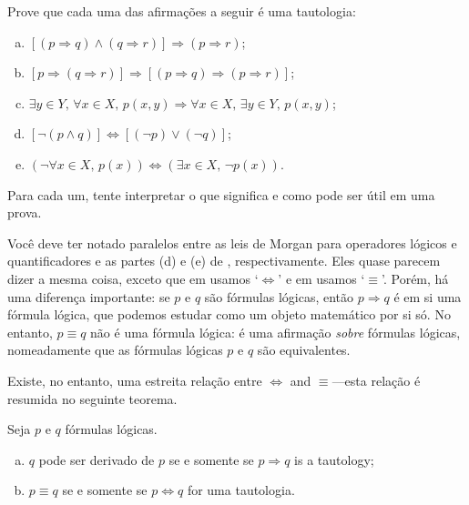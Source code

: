 \begin{exercise}
\label{exTautologies}
Prove que cada uma das afirmações a seguir é uma tautologia:
\begin{enumerate}[(a)]
\item $[(p \Rightarrow q) \wedge (q \Rightarrow r)] \Rightarrow (p \Rightarrow r)$;
\item $[p \Rightarrow (q \Rightarrow r)] \Rightarrow [(p \Rightarrow q) \Rightarrow (p \Rightarrow r)]$;
\item $\exists y \in Y,\, \forall x \in X,\, p(x,y) \Rightarrow \forall x \in X,\, \exists y \in Y,\, p(x,y)$;
\item $[\neg (p \wedge q)] \Leftrightarrow [(\neg p) \vee (\neg q)]$;
\item $(\neg \forall x \in X,\, p(x)) \Leftrightarrow (\exists x \in X,\, \neg p(x))$.
\end{enumerate}
Para cada um, tente interpretar o que significa e como pode ser útil em uma prova.
\end{exercise}

Você deve ter notado paralelos entre as leis de Morgan para operadores lógicos e quantificadores e as partes (d) e (e) de , respectivamente. Eles quase parecem dizer a mesma coisa, exceto que em  usamos `$\Leftrightarrow$' e em  usamos `$\equiv$'. Porém, há uma diferença importante: se $p$ e $q$ são fórmulas lógicas, então $p \Rightarrow q$ é em si uma fórmula lógica, que podemos estudar como um objeto matemático por si só. No entanto, $p \equiv q$ não é uma fórmula lógica: é uma afirmação \textit{sobre} fórmulas lógicas, nomeadamente que as fórmulas lógicas $p$ e $q$ são equivalentes.

Existe, no entanto, uma estreita relação entre $\Leftrightarrow$ and $\equiv$---esta relação é resumida no seguinte teorema.

\begin{theorem}
\label{thmTautologyAndDerivation}
Seja $p$ e $q$ fórmulas lógicas.
\begin{enumerate}[(a)]
\item $q$ pode ser derivado de $p$ se e somente se $p \Rightarrow q$ is a tautology;
\item $p \equiv q$ se e somente se $p \Leftrightarrow q$ for uma tautologia.
\end{enumerate}
\end{theorem}

